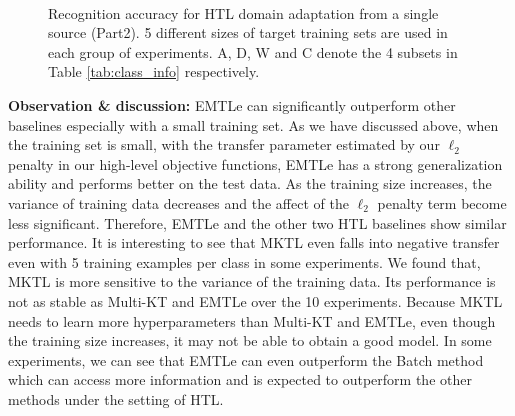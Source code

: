 \begin{figure}[th]
{	}
	\\
	\caption{Recognition accuracy for HTL domain adaptation from a single source (Part2). 5 different sizes of target training sets are used in each group of experiments. A, D, W and C denote the 4 subsets in Table \ref{tab:class_info} respectively.}
\end{figure}
\textbf{Observation \& discussion:} EMTLe can significantly outperform other baselines especially with a small training set. %
As we have discussed above, when the training set is small, with the transfer parameter estimated by our $\ell_2$ penalty in our high-level objective functions, EMTLe has a strong generalization ability and performs better on the test data. As the training size increases, the variance of training data decreases and the affect of the $\ell_2$ penalty term become less significant. Therefore, EMTLe and the other two HTL baselines show similar performance. 
It is interesting to see that MKTL even falls into negative transfer even with 5 training examples per class in some experiments. We found that, MKTL is more sensitive to the variance of the training data. Its performance is not as stable as Multi-KT and EMTLe over the 10 experiments. Because MKTL needs to learn more hyperparameters than Multi-KT and EMTLe, even though the training size increases, it may not be able to obtain a good model. 
In some experiments, we can see that EMTLe can even outperform the Batch method which can access more information and is expected to outperform the other methods under the setting of HTL.